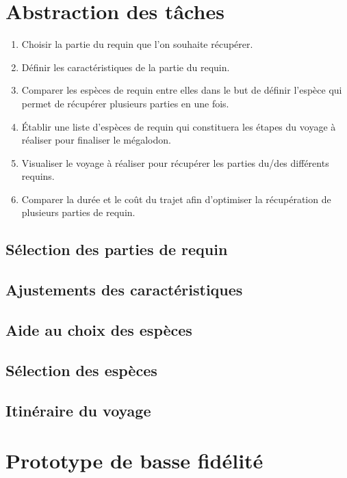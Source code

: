 \documentclass{article}
\begin{document}
\section{Abstraction des tâches}

\begin{enumerate}
	\item Choisir la partie du requin que l’on souhaite récupérer.
	\item Définir les caractéristiques de la partie du requin.
	\item Comparer les espèces de requin entre elles dans le but de définir l’espèce qui permet de récupérer plusieurs parties en une fois.
	\item Établir une liste d’espèces de requin qui constituera les étapes du voyage à réaliser pour finaliser le mégalodon.
	\item Visualiser le voyage à réaliser pour récupérer les parties du/des différents requins.
	\item Comparer la durée et le coût du trajet afin d’optimiser la récupération de plusieurs parties de requin.
\end{enumerate}

\subsection{Sélection des parties de requin}

\subsection{Ajustements des caractéristiques}

\subsection{Aide au choix des espèces}

\subsection{Sélection des espèces}

\subsection{Itinéraire du voyage}

\newpage
\section{Prototype de basse fidélité}
\end{document}
